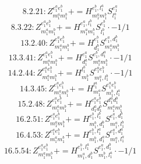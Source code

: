 \documentclass[letterpaper,10pt,fleqn,leqno,onecolumn]{article}
\begin{document}
\begin{equation} \;\;\;\;\;\;  8.2.21: Z^{e_{1}^{a}e_{1}^{b}}_{m_{1}^{a}m_{1}^{b}}+=H^{e_{1}^{b},l_{1}^{a}}_{m_{1}^{a}m_{1}^{b}}S^{e_{1}^{a}}_{l_{1}^{a}} \end{equation}
\begin{equation} \;\;\;\;\;\;  8.3.22: Z^{e_{1}^{a}e_{1}^{b}}_{m_{1}^{a}m_{1}^{b}}+=H^{e_{1}^{a},l_{1}^{b}}_{m_{1}^{a}m_{1}^{b}}S^{e_{1}^{b}}_{l_{1}^{b}}\cdot -1/1 \end{equation}
\begin{equation} \;\;\;\;\;\;  13.2.40: Z^{e_{1}^{a}e_{1}^{b}}_{m_{1}^{a}m_{1}^{b}}+=H^{e_{1}^{b}}_{d_{1}^{b}}S^{e_{1}^{a},d_{1}^{b}}_{m_{1}^{a}m_{1}^{b}} \end{equation}
\begin{equation} \;\;\;\;\;\;  13.3.41: Z^{e_{1}^{a}e_{1}^{b}}_{m_{1}^{a}m_{1}^{b}}+=H^{e_{1}^{a}}_{d_{1}^{a}}S^{e_{1}^{b},d_{1}^{a}}_{m_{1}^{a}m_{1}^{b}}\cdot -1/1 \end{equation}
\begin{equation} \;\;\;\;\;\;  14.2.44: Z^{e_{1}^{a}e_{1}^{b}}_{m_{1}^{a}m_{1}^{b}}+=H^{l_{1}^{b}}_{m_{1}^{b}}S^{e_{1}^{a}e_{1}^{b}}_{m_{1}^{a},l_{1}^{b}}\cdot -1/1 \end{equation}
\begin{equation} \;\;\;\;\;\;  14.3.45: Z^{e_{1}^{a}e_{1}^{b}}_{m_{1}^{a}m_{1}^{b}}+=H^{l_{1}^{a}}_{m_{1}^{a}}S^{e_{1}^{a}e_{1}^{b}}_{m_{1}^{b},l_{1}^{a}} \end{equation}
\begin{equation} \;\;\;\;\;\;  15.2.48: Z^{e_{1}^{a}e_{1}^{b}}_{m_{1}^{a}m_{1}^{b}}+=H^{e_{1}^{a}e_{1}^{b}}_{d_{1}^{a}d_{1}^{b}}S^{d_{1}^{a}d_{1}^{b}}_{m_{1}^{a}m_{1}^{b}} \end{equation}
\begin{equation} \;\;\;\;\;\;  16.2.51: Z^{e_{1}^{a}e_{1}^{b}}_{m_{1}^{a}m_{1}^{b}}+=H^{e_{1}^{b},l_{1}^{b}}_{m_{1}^{b},d_{1}^{b}}S^{e_{1}^{a},d_{1}^{b}}_{m_{1}^{a},l_{1}^{b}} \end{equation}
\begin{equation} \;\;\;\;\;\;  16.4.53: Z^{e_{1}^{a}e_{1}^{b}}_{m_{1}^{a}m_{1}^{b}}+=H^{e_{1}^{b},l_{1}^{a}}_{m_{1}^{b},d_{1}^{a}}S^{e_{1}^{a},d_{1}^{a}}_{m_{1}^{a},l_{1}^{a}} \end{equation}
\begin{equation} \;\;\;\;\;\;  16.5.54: Z^{e_{1}^{a}e_{1}^{b}}_{m_{1}^{a}m_{1}^{b}}+=H^{e_{1}^{b},l_{1}^{a}}_{m_{1}^{a},d_{1}^{b}}S^{e_{1}^{a},d_{1}^{b}}_{m_{1}^{b},l_{1}^{a}}\cdot -1/1 \end{equation}
\end{document}
